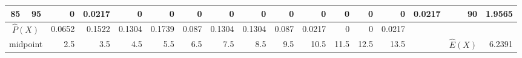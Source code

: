\begin{table}[ht]
\begin{adjustbox}{width = \textwidth, center}
\begin{tabular}{|cc|r|r|r|r|r|r|r|r|r|r|r|r|r|r|r|}
            \rowcolor[HTML]{FFFFFF} 
            \cellcolor[HTML]{C9DAF8}85             & \cellcolor[HTML]{EBF1FC}95             & 0                                              & \cellcolor[HTML]{DEF2E8}0.0217                 & 0                                              & 0                                              & 0                                              & 0                                              & 0                                              & 0                                               & 0                                               & 0                                               & 0                                               & 0                                               & \cellcolor[HTML]{D9D2E9}0.0217                                                  & \cellcolor[HTML]{D9D2E9}90                                              & \cellcolor[HTML]{D9D2E9}1.9565                                                                   \\ \hline
            \multicolumn{2}{|c|}{\cellcolor[HTML]{FCE5CD}$\widehat{P}(X)$}                  & \cellcolor[HTML]{FCE5CD}0.0652                 & \cellcolor[HTML]{FCE5CD}0.1522                 & \cellcolor[HTML]{FCE5CD}0.1304                 & \cellcolor[HTML]{FCE5CD}0.1739                 & \cellcolor[HTML]{FCE5CD}0.087                  & \cellcolor[HTML]{FCE5CD}0.1304                 & \cellcolor[HTML]{FCE5CD}0.1304                 & \cellcolor[HTML]{FCE5CD}0.087                   & \cellcolor[HTML]{FCE5CD}0.0217                  & \cellcolor[HTML]{FCE5CD}0                       & \cellcolor[HTML]{FCE5CD}0                       & \cellcolor[HTML]{FCE5CD}0.0217                  & \multicolumn{1}{l|}{}                                                           & \multicolumn{1}{l|}{}                                                   & \multicolumn{1}{l|}{}                                                                            \\ \hline
            \multicolumn{2}{|c|}{\cellcolor[HTML]{FCE5CD}midpoint}                          & \cellcolor[HTML]{FCE5CD}2.5                    & \cellcolor[HTML]{FCE5CD}3.5                    & \cellcolor[HTML]{FCE5CD}4.5                    & \cellcolor[HTML]{FCE5CD}5.5                    & \cellcolor[HTML]{FCE5CD}6.5                    & \cellcolor[HTML]{FCE5CD}7.5                    & \cellcolor[HTML]{FCE5CD}8.5                    & \cellcolor[HTML]{FCE5CD}9.5                     & \cellcolor[HTML]{FCE5CD}10.5                    & \cellcolor[HTML]{FCE5CD}11.5                    & \cellcolor[HTML]{FCE5CD}12.5                    & \cellcolor[HTML]{FCE5CD}13.5                    & \multicolumn{1}{l|}{}                                                           & \multicolumn{1}{c|}{\cellcolor[HTML]{C9DAF8}$\widehat{E}(X)$}           & \cellcolor[HTML]{C9DAF8}6.2391                                                                   \\ \hline

\end{tabular}
\end{adjustbox}
\end{table}
